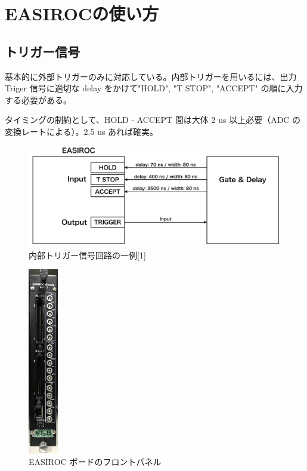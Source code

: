 
\section{EASIROCの使い方}
\subsection{トリガー信号}
基本的に外部トリガーのみに対応している。内部トリガーを用いるには、出力 Triger 信号に適切な delay をかけて"HOLD", "T STOP", "ACCEPT" の順に入力する必要がある。

タイミングの制約として、HOLD - ACCEPT 間は大体 2 us 以上必要（ADC の変換レートによる）。2.5 us あれば確実。

\begin{figure}[H]
\begin{center}
\includegraphics[width = 13.0cm, bb= 0 0 899 358]{1.png}
\end{center}
\caption{内部トリガー信号回路の一例[1]}
\label{fig:}
\end{figure}

\begin{figure}[H]
\begin{center}
\includegraphics[width = 1.3cm, bb= 0 0 588 3683]{4.jpg}
\end{center}
\caption{EASIROC ボードのフロントパネル}
\label{fig:}
\end{figure}

